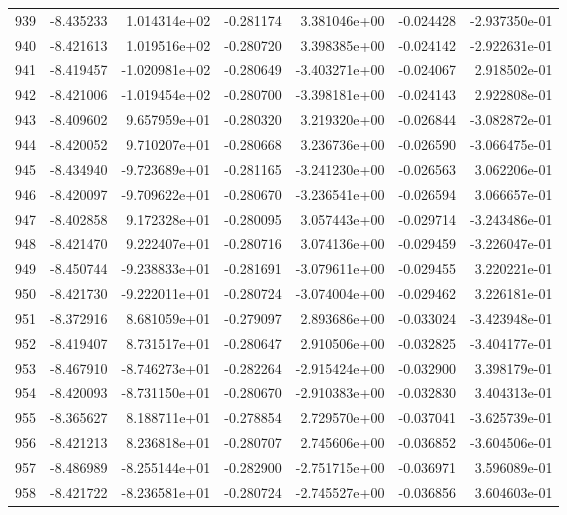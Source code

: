 \begin{tabular}{rrrrrrr}
 939 &  -8.435233 &  1.014314e+02 & -0.281174 &  3.381046e+00 &   -0.024428 & -2.937350e-01 \\
 940 &  -8.421613 &  1.019516e+02 & -0.280720 &  3.398385e+00 &   -0.024142 & -2.922631e-01 \\
 941 &  -8.419457 & -1.020981e+02 & -0.280649 & -3.403271e+00 &   -0.024067 &  2.918502e-01 \\
 942 &  -8.421006 & -1.019454e+02 & -0.280700 & -3.398181e+00 &   -0.024143 &  2.922808e-01 \\
 943 &  -8.409602 &  9.657959e+01 & -0.280320 &  3.219320e+00 &   -0.026844 & -3.082872e-01 \\
 944 &  -8.420052 &  9.710207e+01 & -0.280668 &  3.236736e+00 &   -0.026590 & -3.066475e-01 \\
 945 &  -8.434940 & -9.723689e+01 & -0.281165 & -3.241230e+00 &   -0.026563 &  3.062206e-01 \\
 946 &  -8.420097 & -9.709622e+01 & -0.280670 & -3.236541e+00 &   -0.026594 &  3.066657e-01 \\
 947 &  -8.402858 &  9.172328e+01 & -0.280095 &  3.057443e+00 &   -0.029714 & -3.243486e-01 \\
 948 &  -8.421470 &  9.222407e+01 & -0.280716 &  3.074136e+00 &   -0.029459 & -3.226047e-01 \\
 949 &  -8.450744 & -9.238833e+01 & -0.281691 & -3.079611e+00 &   -0.029455 &  3.220221e-01 \\
 950 &  -8.421730 & -9.222011e+01 & -0.280724 & -3.074004e+00 &   -0.029462 &  3.226181e-01 \\
 951 &  -8.372916 &  8.681059e+01 & -0.279097 &  2.893686e+00 &   -0.033024 & -3.423948e-01 \\
 952 &  -8.419407 &  8.731517e+01 & -0.280647 &  2.910506e+00 &   -0.032825 & -3.404177e-01 \\
 953 &  -8.467910 & -8.746273e+01 & -0.282264 & -2.915424e+00 &   -0.032900 &  3.398179e-01 \\
 954 &  -8.420093 & -8.731150e+01 & -0.280670 & -2.910383e+00 &   -0.032830 &  3.404313e-01 \\
 955 &  -8.365627 &  8.188711e+01 & -0.278854 &  2.729570e+00 &   -0.037041 & -3.625739e-01 \\
 956 &  -8.421213 &  8.236818e+01 & -0.280707 &  2.745606e+00 &   -0.036852 & -3.604506e-01 \\
 957 &  -8.486989 & -8.255144e+01 & -0.282900 & -2.751715e+00 &   -0.036971 &  3.596089e-01 \\
 958 &  -8.421722 & -8.236581e+01 & -0.280724 & -2.745527e+00 &   -0.036856 &  3.604603e-01 \\

\end{tabular}
